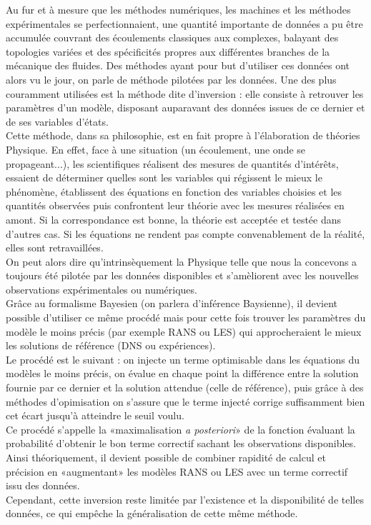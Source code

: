 \documentclass[a4paper,12pt]{article}
\numberwithin{equation}{section} %
\begin{document}
Au fur et à mesure que les méthodes numériques, les machines et les méthodes expérimentales se perfectionnaient, une quantité importante de données a pu être accumulée couvrant des écoulements classiques aux complexes, balayant des topologies variées et des spécificités propres aux différentes branches de la mécanique des fluides. Des méthodes ayant pour but d'utiliser ces données ont alors vu le jour, on parle de méthode pilotées par les données. Une des plus couramment utilisées est la méthode dite d'inversion : elle consiste à retrouver les paramètres d'un modèle, disposant auparavant des données issues de ce dernier et de ses variables d'états. \\

\noindent Cette méthode, dans sa philosophie, est en fait propre à l'élaboration de théories Physique. En effet, face à une situation (un écoulement, une onde se propageant...), les scientifiques réalisent des mesures de quantités d'intérêts, essaient de déterminer quelles sont les variables qui régissent le mieux le phénomène, établissent des équations en fonction des variables choisies et les quantités observées puis confrontent leur théorie avec les mesures réalisées en amont. 
Si la correspondance est bonne, la théorie est acceptée et testée dans d'autres cas. 
Si les équations ne rendent pas compte convenablement de la réalité, elles sont retravaillées. \\
On peut alors dire qu'intrinsèquement la Physique telle que nous la concevons a toujours été pilotée par les données disponibles et s'amèliorent avec les nouvelles observations expérimentales ou numériques. \\

\noindent Grâce au formalisme Bayesien (on parlera d'inférence Baysienne), il devient possible d'utiliser ce même procédé mais pour cette fois trouver les paramètres du modèle le moins précis (par exemple RANS ou LES) qui approcheraient le mieux les solutions de référence (DNS ou expériences).\\ 
Le procédé est le suivant : on injecte un terme optimisable dans les équations du modèles le moins précis, on évalue en chaque point la différence entre la solution fournie par ce dernier et la solution attendue (celle de référence), puis grâce à des méthodes d'opimisation on s'assure que le terme injecté corrige suffisamment bien cet écart jusqu'à atteindre le seuil voulu. \\
Ce procédé s'appelle la «maximalisation \textit{a posteriori}» de la fonction évaluant la probabilité d'obtenir le bon terme correctif sachant les observations disponibles.
Ainsi théoriquement, il devient possible de combiner rapidité de calcul et précision en «augmentant» les modèles RANS ou LES avec un terme correctif issu des données.\\
Cependant, cette inversion reste limitée par l'existence et la disponibilité de telles données, ce qui empêche la généralisation de cette même méthode.\\
\end{document}
